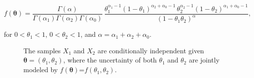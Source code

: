 \documentclass[AMA,Times1COL]{WileyNJDv5} %
\newcommand{\bX}{\boldsymbol{\mathrm{X}}}
\begin{document}
\begin{equation}\label{prior}
f(\boldsymbol{\theta})=\dfrac{\Gamma(\alpha)}{\Gamma(\alpha_1)\Gamma(\alpha_2)\Gamma(\alpha_0)} \, \dfrac{\theta_1^{\alpha_1-1} (1-\theta_1)^{\alpha_2+\alpha_0-1}\, \theta_2^{\alpha_2-1} (1-\theta_2)^{\alpha_1+\alpha_0-1}}{(1-\theta_1\theta_2)^{\alpha}},
\end{equation}

for $0 < \theta_1 < 1$, $0 < \theta_2 < 1$, and $\alpha = \alpha_1 + \alpha_2 + \alpha_0$.

\begin{figure}[ht]
    \centering
    \caption{The samples \(X_1\) and \(X_2\) are conditionally independent given \(\boldsymbol{\theta} = (\theta_1, \theta_2)\), where the uncertainty of both \(\theta_1\) and \(\theta_2\) are jointly modeled by \(f(\boldsymbol{\theta})\)=\(f(\theta_1, \theta_2)\).}
    \label{fig:diagrama_muestras}
\end{figure}





\end{document}
